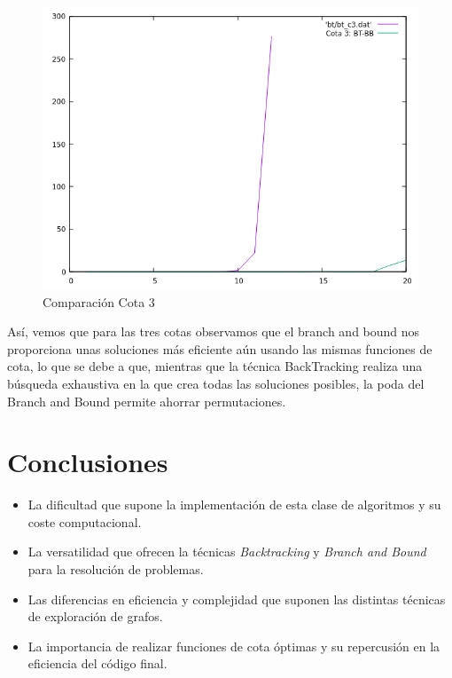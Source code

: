 \documentclass[a4paper,12pt,twoside]{article} %
\begin{document}
\newpage
\begin{figure}[h]
  \begin{center}
  
  	\includegraphics[scale=0.7]{IMAGENES/bt_bb_c3.png}
  	\caption{Comparación Cota 3}
  	
  \end{center}
\end{figure}

Así, vemos que para las tres cotas observamos que el branch and bound nos proporciona unas soluciones más eficiente aún usando las mismas funciones de cota, lo que se debe a que, mientras que la técnica BackTracking realiza una búsqueda exhaustiva en la que crea todas las soluciones posibles, la poda del Branch and Bound permite ahorrar permutaciones.
\newpage

\section{Conclusiones} 

\begin{itemize}
	\item La dificultad que supone la implementación de esta clase de algoritmos y su coste computacional.
	\item La versatilidad que ofrecen la técnicas \textit{Backtracking} y \textit{Branch and Bound} para la resolución de problemas.
	\item Las diferencias en eficiencia y complejidad que suponen las distintas técnicas de exploración de grafos.
 \item La importancia de realizar funciones de cota óptimas y su repercusión en la eficiencia del código final.

\end{itemize}
\end{document}
